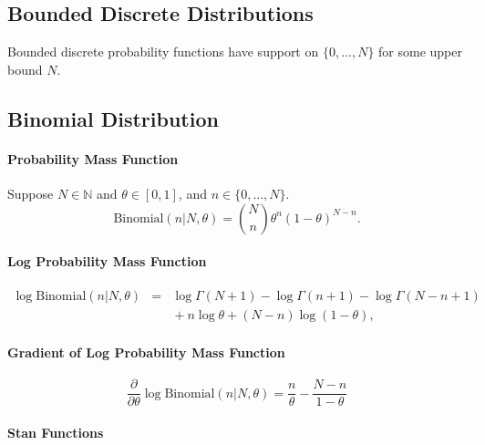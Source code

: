 \begin{description}
\chapter{Bounded Discrete Distributions}\label{betafun.chapter}


Bounded discrete probability functions have support on $\{ 0, \ldots, N \}$ for some upper bound $N$.


\section{Binomial Distribution}


\subsubsection{Probability Mass Function}


Suppose $N \in \mathbb{N}$ and $\theta \in [0,1]$, and $n \in \{0,\ldots,N\}$. \[ \text{Binomial}(n|N,\theta) = \binom{N}{n} \theta^n (1 - \theta)^{N - n}. \] 

\subsubsection{Log Probability Mass Function}


\begin{eqnarray*} \log \text{Binomial}(n|N,\theta) & = & \log \Gamma(N+1) - \log \Gamma(n + 1) - \log \Gamma(N- n + 1) \\[4pt] & & { } + n \log \theta + (N - n) \log (1 - \theta), \end{eqnarray*}



\subsubsection{Gradient of Log Probability Mass Function}

 \[ \frac{\partial}{\partial \theta} \log \text{Binomial}(n|N,\theta) = \frac{n}{\theta} - \frac{N - n}{1 - \theta} \] 



\subsubsection{Stan Functions}



\end{description}
